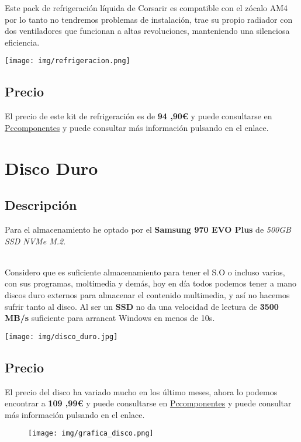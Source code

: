 \documentclass{article}
\begin{document}
        \begin{minipage}{0.5\textwidth}
          Este pack de refrigeración líquida de Corsarir es compatible con el zócalo AM4 por lo tanto no tendremos problemas de instalación,  trae su propio radiador con dos ventiladores que funcionan a altas revoluciones, manteniendo
            una silenciosa eficiencia.
        \end{minipage}
        \begin{minipage}{\textwidth}
          \texttt{[image: img/refrigeracion.png]}
        \end{minipage}
      \subsection{Precio}
        El precio de este kit de refrigeración es de \textbf{94 ,90€} y puede consultarse en 
        \href{https://www.pccomponentes.com/corsair-hydro-h100x-kit-de-refrigeracion-liquida}{Pccomponentes} y puede consultar más información pulsando en el enlace.
        
  \newpage
    \section{Disco Duro}
      \subsection{Descripción}
        Para el almacenamiento he optado por el \textbf{Samsung 970 EVO Plus} de \textit{500GB SSD NVMe M.2}.
        \\\\
        \begin{minipage}{0.5\textwidth}
          Considero que es suficiente almacenamiento para tener el S.O o incluso varios, con sus programas, moltimedia y demás, hoy en día todos podemos tener a mano discos duro externos para almacenar el contenido multimedia, y así no hacemos sufrir tanto al disco. Al ser un \textbf{SSD} no da una velocidad de lectura de \textbf{3500 MB/s} suficiente para arrancat Windows en menos de 10s.
        \end{minipage}
        \begin{minipage}{\textwidth}
          \texttt{[image: img/disco\_duro.jpg]}
        \end{minipage}
      \subsection{Precio}
        El precio del disco ha variado mucho en los último meses, ahora lo podemos encontrar a 
        \textbf{109 ,99€} y puede consultarse en 
        \href{https://www.pccomponentes.com/samsung-970-evo-plus-500gb-ssd-nvme-m2}{Pccomponentes} y puede consultar más información pulsando en el enlace.
        \\
        \begin{figure}[h]
          \centering
          \texttt{[image: img/grafica\_disco.png]}
        \end{figure}
\end{document}
